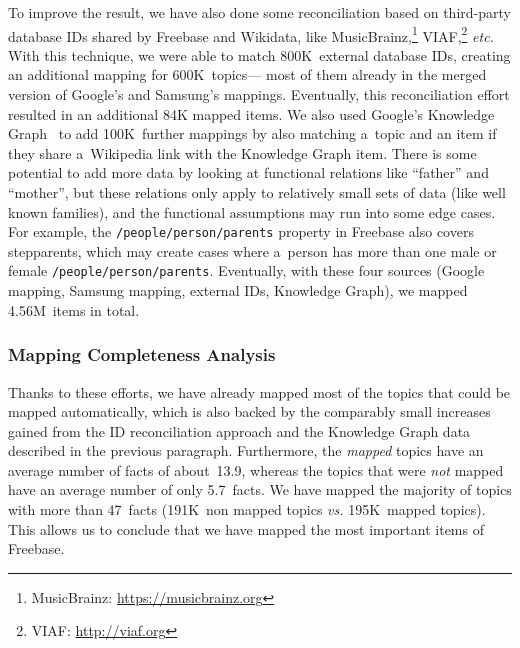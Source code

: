 \documentclass{sig-alternate}
\begin{document}
To improve the result, we have also done some reconciliation based on third-party database IDs
shared by Freebase and Wikidata, like MusicBrainz,\footnote{MusicBrainz: \url{https://musicbrainz.org}}
VIAF,\footnote{VIAF: \url{http://viaf.org}} \emph{etc.}
With this technique, we were able to match 800K~external database IDs,
creating an additional mapping for 600K~topics---%
most of them already in the merged version of Google's and Samsung's mappings.
Eventually, this reconciliation effort resulted in an additional 84K mapped items.
We also used Google's Knowledge Graph~\cite{singhal2012} to add 100K~further mappings
by also matching a~topic and an item if they share a~Wikipedia link with the Knowledge Graph item.
There is some potential to add more data by looking at functional relations
like ``father'' and ``mother'', but these relations only apply to relatively small sets of data
(like well known families), and the functional assumptions may run into some edge cases.
For example, the \texttt{/people/person/parents} property in Freebase also covers stepparents,
which may create cases where a~person has more than one male or female \texttt{/people/person/parents}.
Eventually, with these four sources (Google mapping, Samsung mapping, external IDs, Knowledge Graph),
we mapped 4.56M~items in total.

\subsubsection{Mapping Completeness Analysis}

Thanks to these efforts, we have already mapped most of the topics that could be mapped automatically,
which is also backed by the comparably small increases gained from the ID reconciliation approach 
and the Knowledge Graph data described in the previous paragraph.
Furthermore, the \emph{mapped} topics have an average number of facts of about~13.9,
whereas the topics that were \emph{not} mapped have an average number of only 5.7~facts.
We have mapped the majority of topics with more than 47~facts
(191K~non mapped topics \textit{vs.} 195K~mapped topics).
This allows us to conclude that we have mapped the most important items of Freebase.
\end{document}
